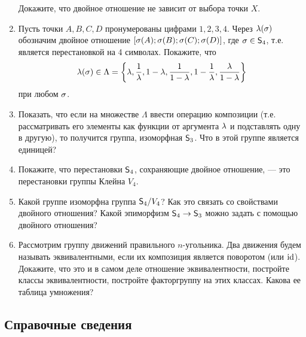 \begin{enumerate}
Докажите, что двойное отношение не зависит от выбора точки $X$.

\item Пусть точки $A,B,C,D$ пронумерованы цифрами $1,2,3,4$. Через $\lambda(\sigma)$ обозначим двойное отношение $[\sigma(A);\sigma(B);\sigma(C);\sigma(D)]$, где $\sigma\in{\mathsf{S}}_4$, т.е. является перестановкой на 4 символах. Покажите, что
$$
\lambda(\sigma) \in \Lambda = \left\{\lambda,\frac{1}{\lambda},1-\lambda,\frac{1}{1-\lambda},1-\frac{1}{\lambda},\frac{\lambda}{1-\lambda}\right\}
$$
при любом $\sigma$.

\item Показать, что если на множестве $\Lambda$ ввести операцию композиции (т.е. рассматривать его элементы как функции от аргумента $\lambda$ и подставлять одну в другую), то получится группа, изоморфная ${\mathsf{S}}_3$. Что в этой группе является единицей?

\item Покажите, что перестановки ${\mathsf{S}}_4$, сохраняющие двойное отношение, --- это перестановки группы Клейна $V_4$.

\item Какой группе изоморфна группа ${\mathsf{S}}_4/V_4$? Как это связать со свойствами двойного отношения? Какой эпиморфизм ${\mathsf{S}}_4\to{\mathsf{S}}_3$ можно задать с помощью двойного отношения?

\item Рассмотрим группу движений правильного $n$-угольника. Два движения будем называть эквивалентными, если их композиция является поворотом (или $\mathrm{id}$). Докажите, что это и в самом деле отношение эквивалентности, постройте классы эквивалентности, постройте факторгруппу на этих классах. Какова ее таблица умножения?

\end{enumerate}

\subsection*{Справочные сведения}

